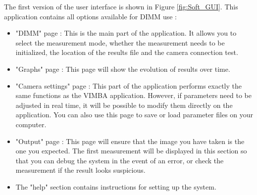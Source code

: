 The first version of the user interface is shown in Figure \ref{fig:Soft_GUI}.
This application contains all options available for \Gls{DIMM} use :
\begin{itemize}
    \item "\Gls{DIMM}" page : This is the main part of the application. It allows you to select the measurement mode,
          whether the measurement needs to be initialized, the location of the results file and the camera connection test.
    \item "Graphs" page : This page will show the evolution of results over time.
    \item "Camera settings" page : This part of the application performs exactly the same functions as the VIMBA application.
          However, if parameters need to be adjusted in real time, it will be possible to modify them directly on the application.
          You can also use this page to save or load parameter files on your computer.
    \item "Output" page : This page will ensure that the image you have taken is the one you expected.
          The first measurement will be displayed in this section so that you can debug the system in the event of an error,
          or check the measurement if the result looks suspicious.
    \item The "help" section contains instructions for setting up the system.
\end{itemize}
